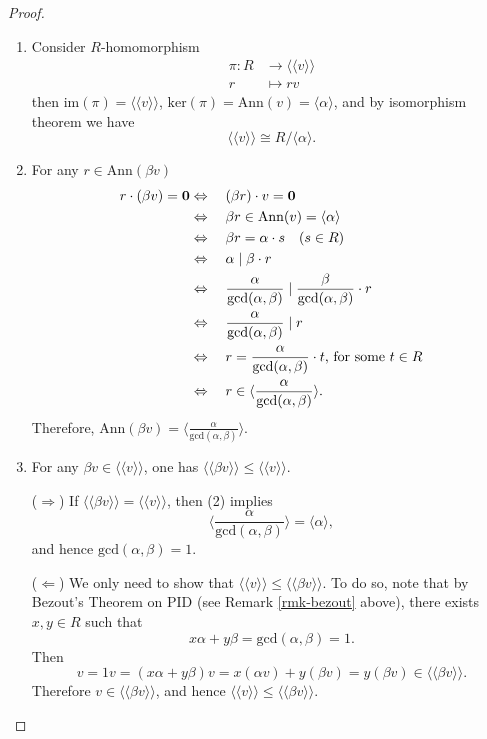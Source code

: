 \documentclass[11pt,openany]{book}
\theoremstyle{plain}
\theoremstyle{definition}
\theoremstyle{remark}
\begin{document}
\begin{proof}
    \begin{enumerate}
        \item Consider $R$-homomorphism 
        \begin{align*}
            \pi :  R&\rightarrow \langle \langle v \rangle\rangle \\
                   r&\mapsto rv
        \end{align*}
        then $\mathrm{im}(\pi)=\langle\langle v\rangle\rangle$, $\mathrm{ker}(\pi)=\mathrm{Ann}(v)=\langle \alpha \rangle $, and by isomorphism theorem we have $$\langle\langle v\rangle\rangle \cong R/\langle \alpha \rangle.$$
        \item For any $r\in \mathrm{Ann}(\beta v)$
        \begin{align*}
            r\cdot(\beta v)={\bf 0} 
            &\Leftrightarrow\quad (\beta r)\cdot v={\bf 0}\\
            &\Leftrightarrow\quad \beta r\in \mathrm{Ann}(v)=\langle \alpha\rangle\\
            &\Leftrightarrow\quad \beta r=\alpha\cdot s\quad(s\in R)\\
            &\Leftrightarrow\quad \alpha \mid\beta\cdot r\\
            &\Leftrightarrow\quad \frac{\alpha}{\mathrm{gcd}(\alpha , \beta)}\mid\frac{\beta}{\mathrm{gcd}(\alpha , \beta)}\cdot r\\
            &\Leftrightarrow\quad \frac{\alpha}{\mathrm{gcd}(\alpha , \beta)}\mid r\\
            &\Leftrightarrow\quad r=\frac{\alpha}{\mathrm{gcd}(\alpha , \beta)}\cdot t\text{, for some }t\in R\\
            &\Leftrightarrow\quad r\in\langle\frac{\alpha}{\mathrm{gcd}(\alpha , \beta)}\rangle.
        \end{align*}
        Therefore, $\mathrm{Ann}(\beta v)=\langle\frac{\alpha}{\mathrm{gcd}(\alpha , \beta)}\rangle$.
        \medskip
        \item For any $\beta v\in \langle\langle v\rangle\rangle$, one has $\langle\langle\beta v\rangle\rangle\leq\langle\langle
         v\rangle\rangle$.

         ($\Rightarrow$) If $\langle\langle \beta v\rangle\rangle=\langle\langle v\rangle\rangle$, then (2) implies
         $$\langle\frac{\alpha}{\mathrm{gcd}(\alpha , \beta)}\rangle=\langle\alpha\rangle,$$
         and hence $\mathrm{gcd}(\alpha, \beta)=1.$

         ($\Leftarrow$) We only need to show that $\langle\langle v\rangle\rangle\leq\langle\langle\beta v\rangle\rangle$. To do so, note that by Bezout's Theorem on PID (see Remark \ref{rmk-bezout} above), there exists $x,y\in R$ such that
         $$x\alpha+y\beta= \mathrm{gcd}(\alpha,\beta) = 1.$$
         Then
        $$v= 1v = (x\alpha+y\beta)v=x(\alpha v)+y(\beta v)=y(\beta v)\in\langle\langle\beta v\rangle\rangle.$$
        Therefore $v\in\langle\langle\beta v\rangle\rangle$, and hence $\langle\langle v\rangle\rangle\leq\langle\langle \beta v\rangle\rangle.$
        
    \end{enumerate}
\end{proof}
\end{document}
